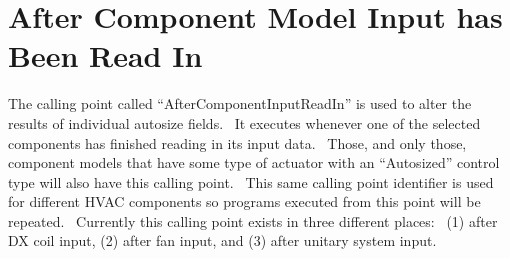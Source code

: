 \section{After Component Model Input has Been Read In}\label{after-component-model-input-has-been-read-in}

The calling point called ``AfterComponentInputReadIn'' is used to alter the results of individual autosize fields.~ It executes whenever one of the selected components has finished reading in its input data.~ Those, and only those, component models that have some type of actuator with an ``Autosized'' control type will also have this calling point.~ This same calling point identifier is used for different HVAC components so programs executed from this point will be repeated.~ Currently this calling point exists in three different places:~ (1) after DX coil input, (2) after fan input, and (3) after unitary system input.
